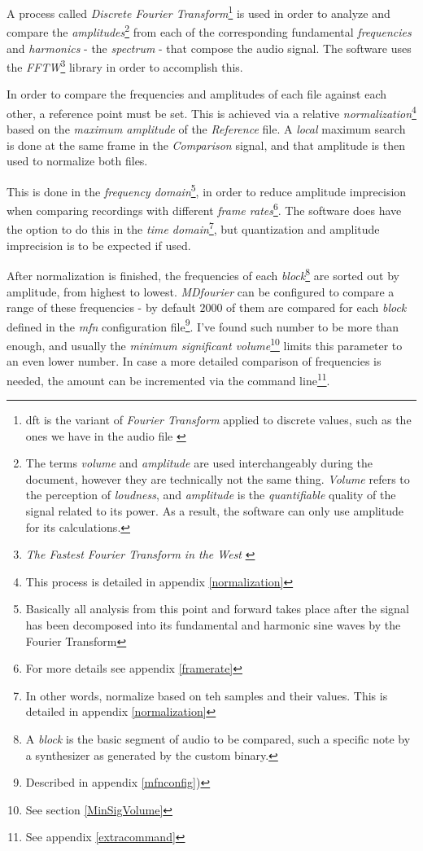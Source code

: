 \documentclass[10pt,a4paper]{report}
\begin{document}
A process called \textit{Discrete Fourier Transform}\footnote{\gls{dft} is the variant of \textit{Fourier Transform} applied to discrete values, such as the ones we have in the audio file \cite{FourierTransformApps}} is used in order to analyze and compare the \textit{amplitudes}\footnote{The terms \textit{volume} and \textit{amplitude} are used interchangeably during the document, however they are technically not the same thing. \textit{Volume} refers to the perception of \textit{loudness}, and \textit{amplitude} is the \textit{quantifiable} quality of the signal related to its power. As a result, the software can only use amplitude for its calculations.} from each of the corresponding fundamental \textit{frequencies} and \textit{harmonics} - the \textit{spectrum} -  that compose the audio signal. The software uses the \textit{FFTW}\footnote{\textit{The Fastest Fourier Transform in the West} \cite{fftw}} library in order to accomplish this.

In order to compare the frequencies and amplitudes of each file against each other, a reference point must be set. This is achieved via a relative \textit{normalization}\footnote{This process is detailed in appendix \ref{normalization}} based on the \textit{maximum amplitude} of the \textit{Reference} file. A \textit{local} maximum search is done at the same frame in the \textit{Comparison} signal, and that amplitude is then used to normalize both files. 

This is done in the \textit{frequency domain}\footnote{Basically all analysis from this point and forward takes place after the signal has been decomposed into its fundamental and harmonic sine waves by the Fourier Transform}, in order to reduce amplitude imprecision when comparing recordings with different \textit{frame rates}\footnote{For more details see appendix \ref{framerate}}. The software does have the option to do this in the \textit{time domain}\footnote{In other words, normalize based on teh samples and their values. This is detailed in appendix \ref{normalization}}, but quantization and amplitude imprecision is to be expected if used.

After normalization is finished, the frequencies of each \textit{block}\footnote{A \textit{block} is the basic segment of audio to be compared, such a specific note by a synthesizer as generated by the custom binary.} are sorted out by amplitude, from highest to lowest. \textit{MDfourier} can be configured to compare a range of these frequencies - by default $2000$ of them are compared for each \textit{block} defined in the \textit{mfn} configuration file\footnote{Described in appendix \ref{mfnconfig})}. I've found such number to be more than enough, and usually the \textit{minimum significant volume}\footnote{See section \ref{MinSigVolume}} limits this parameter to an even lower number. In case a more detailed comparison of frequencies is needed, the amount can be incremented via the command line\footnote{See appendix \ref{extracommand}}.
\end{document}
